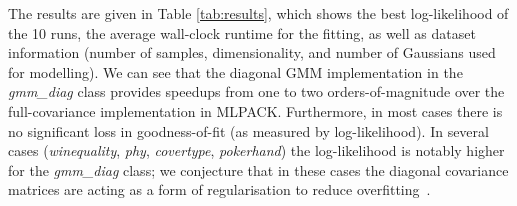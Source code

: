\documentclass[10pt,a4paper]{article}
\begin{document}
The results are given in Table \ref{tab:results}, which shows the best log-likelihood of the 10 runs,
the average wall-clock runtime for the fitting,
as well as dataset information
(number of samples, dimensionality, and number of Gaussians used for modelling).
We can see that the diagonal GMM implementation in 
the {\it gmm\_diag} class provides speedups from one to two orders-of-magnitude
over the full-covariance implementation in \mbox{MLPACK}.
Furthermore, in most cases there is no significant loss in goodness-of-fit (as measured by log-likelihood).
In several cases ({\it winequality}, {\it phy}, {\it covertype}, {\it pokerhand})
the log-likelihood is notably higher for the {\it gmm\_diag} class;
we conjecture that in these cases the diagonal covariance matrices are acting as a form of regularisation to reduce overfitting~\cite{Bishop_2006}.
\end{document}
